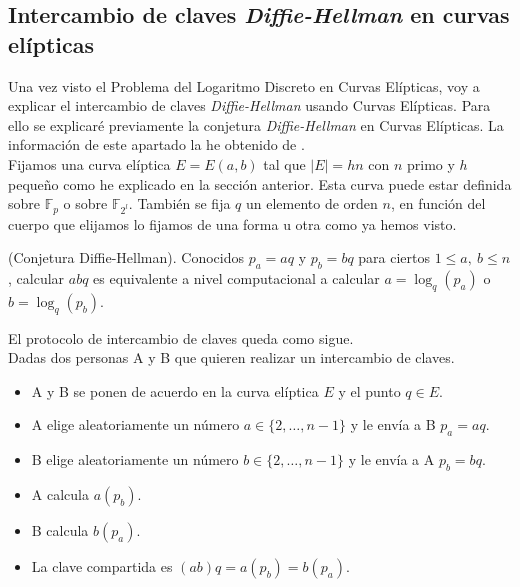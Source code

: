 \subsection{Intercambio de claves \emph{Diffie-Hellman} en curvas elípticas}
Una vez visto el Problema del Logaritmo Discreto en Curvas Elípticas, voy a explicar el intercambio de claves \emph{Diffie-Hellman} usando Curvas Elípticas. Para ello se explicaré previamente la conjetura \emph{Diffie-Hellman} en Curvas Elípticas. La información de este apartado la he obtenido de \cite{apuntesCriptografia}.\\
Fijamos una curva elíptica $E=E(a,b)$ tal que $|E|=hn$ con $n$ primo y $h$ pequeño como he explicado en la sección anterior. Esta curva puede estar definida sobre $\mathbb{F}_p$ o sobre $\mathbb{F}_{2^l}$. También se fija  $q$ un elemento de orden $n$, en función del cuerpo que elijamos lo fijamos de una forma u otra como ya hemos visto.
\begin{definicion}
	(Conjetura Diffie-Hellman). Conocidos $p_a=aq$ y $p_b=bq$ para ciertos $1\leq a,\: b\leq n$, calcular $abq$ es equivalente a nivel computacional a calcular $a=\log_q(p_a)$ o $b=\log_q(p_b)$.
\end{definicion}
El protocolo de intercambio de claves queda como sigue.\\
Dadas dos personas A y B que quieren realizar un intercambio de claves.
\begin{itemize}
	\item A y B se ponen de acuerdo en la curva elíptica $E$ y el punto $q\in E$.
	\item A elige aleatoriamente un número $a\in\{2,\dots,n-1\}$ y le envía a B $p_a=aq$.
	\item B elige aleatoriamente un número $b\in\{2,\dots,n-1\}$ y le envía a A $p_b=bq$.
	\item A calcula $a(p_b)$.
	\item B calcula $b(p_a)$.
	\item La clave compartida es $(ab)q=a(p_b)=b(p_a)$.
\end{itemize}

